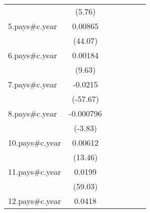{\begin{tabular}{l*{6}{c}}
                    &      (5.76)         &                     &                     &                     &                     &                     \\
[1em]
5.pays#c.year       &     0.00865\sym{***}&                     &                     &                     &                     &                     \\
                    &     (44.07)         &                     &                     &                     &                     &                     \\
[1em]
6.pays#c.year       &     0.00184\sym{***}&                     &                     &                     &                     &                     \\
                    &      (9.63)         &                     &                     &                     &                     &                     \\
[1em]
7.pays#c.year       &     -0.0215\sym{***}&                     &                     &                     &                     &                     \\
                    &    (-57.67)         &                     &                     &                     &                     &                     \\
[1em]
8.pays#c.year       &   -0.000796\sym{***}&                     &                     &                     &                     &                     \\
                    &     (-3.83)         &                     &                     &                     &                     &                     \\
[1em]
10.pays#c.year      &     0.00612\sym{***}&                     &                     &                     &                     &                     \\
                    &     (13.46)         &                     &                     &                     &                     &                     \\
[1em]
11.pays#c.year      &      0.0199\sym{***}&                     &                     &                     &                     &                     \\
                    &     (59.03)         &                     &                     &                     &                     &                     \\
[1em]
12.pays#c.year      &      0.0418\sym{***}&                     &                     &                     &                     &                     \\

\end{tabular}}

